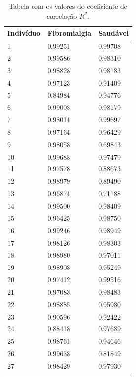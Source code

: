 \documentclass{ufscThesis}
\begin{document}
\begin{table}[h]
\centering
\begin{tabular}{|l|l|l|}
\hline
Indivíduo & Fibromialgia & Saudável \\ \hline
1         & 0.99251      & 0.99708  \\ \hline
2         & 0.99586      & 0.98310  \\ \hline
3         & 0.98828      & 0.98183  \\ \hline
4         & 0.97123      & 0.91409  \\ \hline
5         & 0.84984      & 0.94776  \\ \hline
6         & 0.99008      & 0.98179  \\ \hline
7         & 0.98014      & 0.99697  \\ \hline
8         & 0.97164      & 0.96429  \\ \hline
9         & 0.98058      & 0.69843  \\ \hline
10        & 0.99688      & 0.97479  \\ \hline
11        & 0.97578      & 0.88673  \\ \hline
12        & 0.98979      & 0.89490  \\ \hline
13        & 0.96874      & 0.71188  \\ \hline
14        & 0.99500      & 0.98409  \\ \hline
15        & 0.96425      & 0.98750  \\ \hline
16        & 0.99246      & 0.98949  \\ \hline
17        & 0.98126      & 0.98303  \\ \hline
18        & 0.98980      & 0.97011  \\ \hline
19        & 0.98908      & 0.95249  \\ \hline
20        & 0.97412      & 0.99516  \\ \hline
21        & 0.97083      & 0.98483  \\ \hline
22        & 0.98885      & 0.95980  \\ \hline
23        & 0.90596      & 0.92422  \\ \hline
24        & 0.88418      & 0.97689  \\ \hline
25        & 0.98761      & 0.94646  \\ \hline
26        & 0.99638      & 0.81849  \\ \hline
27        & 0.98429      & 0.97930  \\ \hline
\end{tabular}
\caption{Tabela com os valores do coeficiente de correlação $R^2$.}
\label{tabelar2}
\end{table}
\end{document}
